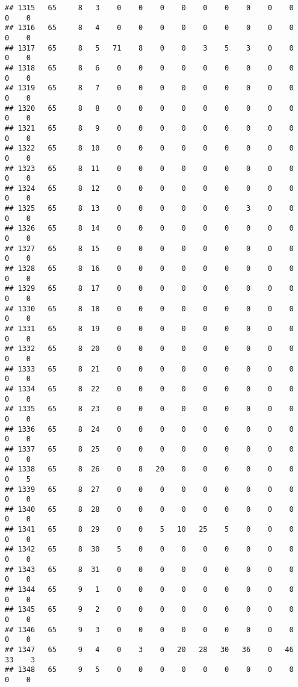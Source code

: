 \documentclass[]{article}
\begin{document}
\begin{verbatim}
## 1315   65     8   3    0    0    0    0    0    0    0    0    0    0    0
## 1316   65     8   4    0    0    0    0    0    0    0    0    0    0    0
## 1317   65     8   5   71    8    0    0    3    5    3    0    0    0    0
## 1318   65     8   6    0    0    0    0    0    0    0    0    0    0    0
## 1319   65     8   7    0    0    0    0    0    0    0    0    0    0    0
## 1320   65     8   8    0    0    0    0    0    0    0    0    0    0    0
## 1321   65     8   9    0    0    0    0    0    0    0    0    0    0    0
## 1322   65     8  10    0    0    0    0    0    0    0    0    0    0    0
## 1323   65     8  11    0    0    0    0    0    0    0    0    0    0    0
## 1324   65     8  12    0    0    0    0    0    0    0    0    0    0    0
## 1325   65     8  13    0    0    0    0    0    0    3    0    0    0    0
## 1326   65     8  14    0    0    0    0    0    0    0    0    0    0    0
## 1327   65     8  15    0    0    0    0    0    0    0    0    0    0    0
## 1328   65     8  16    0    0    0    0    0    0    0    0    0    0    0
## 1329   65     8  17    0    0    0    0    0    0    0    0    0    0    0
## 1330   65     8  18    0    0    0    0    0    0    0    0    0    0    0
## 1331   65     8  19    0    0    0    0    0    0    0    0    0    0    0
## 1332   65     8  20    0    0    0    0    0    0    0    0    0    0    0
## 1333   65     8  21    0    0    0    0    0    0    0    0    0    0    0
## 1334   65     8  22    0    0    0    0    0    0    0    0    0    0    0
## 1335   65     8  23    0    0    0    0    0    0    0    0    0    0    0
## 1336   65     8  24    0    0    0    0    0    0    0    0    0    0    0
## 1337   65     8  25    0    0    0    0    0    0    0    0    0    0    0
## 1338   65     8  26    0    8   20    0    0    0    0    0    0    0    5
## 1339   65     8  27    0    0    0    0    0    0    0    0    0    0    0
## 1340   65     8  28    0    0    0    0    0    0    0    0    0    0    0
## 1341   65     8  29    0    0    5   10   25    5    0    0    0    0    0
## 1342   65     8  30    5    0    0    0    0    0    0    0    0    0    0
## 1343   65     8  31    0    0    0    0    0    0    0    0    0    0    0
## 1344   65     9   1    0    0    0    0    0    0    0    0    0    0    0
## 1345   65     9   2    0    0    0    0    0    0    0    0    0    0    0
## 1346   65     9   3    0    0    0    0    0    0    0    0    0    0    0
## 1347   65     9   4    0    3    0   20   28   30   36    0   46   33    3
## 1348   65     9   5    0    0    0    0    0    0    0    0    0    0    0

\end{verbatim}
\end{document}
